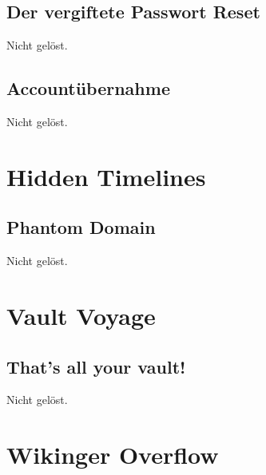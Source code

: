 \documentclass[12pt, a4paper, titlepage, oneside]{scrartcl}
\begin{document}
	\subsection{Der vergiftete Passwort Reset}
	Nicht gelöst.

	\subsection{Accountübernahme}
	Nicht gelöst.

	\section{Hidden Timelines}

	\subsection{Phantom Domain}
	Nicht gelöst.

	\section{Vault Voyage}

	\subsection{That's all your vault!}
	Nicht gelöst.

	\section{Wikinger Overflow}
\end{document}
